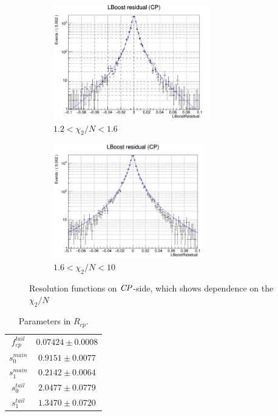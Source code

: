 \begin{figure}[htbp]
	\begin{subfigure}{0.5\linewidth}
		\caption{$1.2<\chi_2/N<1.6$}
		\includegraphics[height=5cm]{figures/residual1.2_1.6}
	\end{subfigure}
	\begin{subfigure}{0.5\linewidth}
		\caption{$1.6<\chi_2/N<10$}
		\includegraphics[height=5cm]{figures/residual1.6_10}
	\end{subfigure}
	\caption{Resolution functions on $\it{CP}$-side, which shows dependence on the $\chi_2/N$}
	\label{fig:redchi2fit}
\end{figure}

\begin{table}[H]
	\begin{minipage}[b]{1.0\linewidth}
		\centering
		\caption{Parameters in $R_{cp}$.}
		\label{tab:Rcp}
		\begin{tabular}{|c|c|}
			\hline
			$f_{cp}^{tail}$ & $0.07424 \pm 0.0008$\\
			$s_0^{main}$&  $0.9151 \pm 0.0077$ \\
			$s_1^{main}$ & $0.2142\pm 0.0064$\\
			$s_0^{tail}$ &  $2.0477\pm 0.0779$\\
			$s_1^{tail}$  & $1.3470\pm 0.0720$ \\
			\hline
		\end{tabular}
	\end{minipage}
\end{table}

